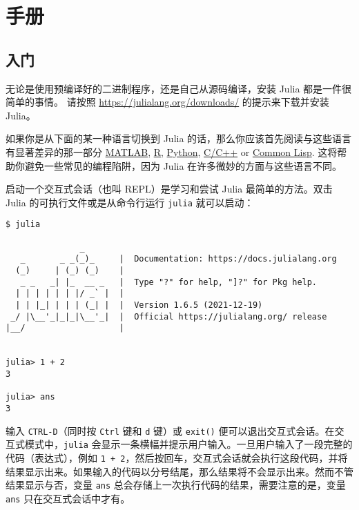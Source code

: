 
\part{手册}


\hypertarget{14943148626325101976}{}


\chapter{入门}



无论是使用预编译好的二进制程序，还是自己从源码编译，安装 Julia 都是一件很简单的事情。 请按照 \href{https://julialang.org/downloads/}{https://julialang.org/downloads/} 的提示来下载并安装 Julia。



如果你是从下面的某一种语言切换到 Julia 的话，那么你应该首先阅读与这些语言有显著差异的那一部分 \hyperlink{16118462231453533890}{MATLAB}, \hyperlink{751329316482051792}{R}, \hyperlink{6816556507610262594}{Python}, \hyperlink{17325153651592351510}{C/C++} or \hyperlink{1976420457538472404}{Common Lisp}. 这将帮助你避免一些常见的编程陷阱，因为 Julia 在许多微妙的方面与这些语言不同。



启动一个交互式会话（也叫 REPL）是学习和尝试 Julia 最简单的方法。双击 Julia 的可执行文件或是从命令行运行 \texttt{julia} 就可以启动：




\begin{lstlisting}
$ julia

               _
   _       _ _(_)_     |  Documentation: https://docs.julialang.org
  (_)     | (_) (_)    |
   _ _   _| |_  __ _   |  Type "?" for help, "]?" for Pkg help.
  | | | | | | |/ _` |  |
  | | |_| | | | (_| |  |  Version 1.6.5 (2021-12-19)
 _/ |\__'_|_|_|\__'_|  |  Official https://julialang.org/ release
|__/                   |


julia> 1 + 2
3

julia> ans
3
\end{lstlisting}



输入 \texttt{CTRL-D}（同时按 \texttt{Ctrl} 键和 \texttt{d} 键）或 \texttt{exit()} 便可以退出交互式会话。在交互式模式中，\texttt{julia} 会显示一条横幅并提示用户输入。一旦用户输入了一段完整的代码（表达式），例如 \texttt{1 + 2}，然后按回车，交互式会话就会执行这段代码，并将结果显示出来。如果输入的代码以分号结尾，那么结果将不会显示出来。然而不管结果显示与否，变量 \texttt{ans} 总会存储上一次执行代码的结果，需要注意的是，变量 \texttt{ans} 只在交互式会话中才有。



